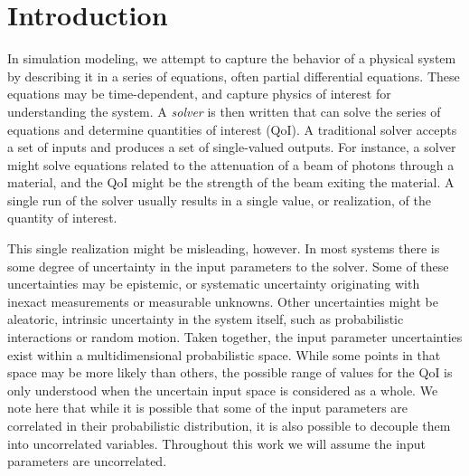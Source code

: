 
\chapter{Introduction} %

\label{ch:intro} %




In simulation modeling, we attempt to capture the behavior of a physical system by describing it in a series
of equations, often partial differential equations.  These equations may be time-dependent, and capture
physics of interest for understanding the system.  A \emph{solver} is then written that can solve the series
of equations and determine quantities of interest (QoI).  A traditional solver accepts a set of inputs and
produces a set of single-valued outputs.  For instance, a solver might solve equations related to the
attenuation of a beam of photons through a material, and the QoI might be the strength of the beam exiting the
material.  A single run of the solver usually results in a single value, or realization, of the quantity of
interest.

This single realization might be misleading, however.  In most systems there is some degree of uncertainty in
the input parameters to the solver.  Some of these uncertainties may be epistemic, or systematic uncertainty
originating with inexact measurements or measurable unknowns.  Other uncertainties might be aleatoric,
intrinsic uncertainty in the system itself, such as probabilistic interactions or random motion.  Taken
together, the input parameter uncertainties exist within a multidimensional probabilistic space.  While some
points in that space may be more likely than others, the possible range of values for the QoI is only
understood when the uncertain input space is considered as a whole.  We note here that while it is possible
that some of the input parameters are correlated in their probabilistic distribution, it is also possible to
decouple them into uncorrelated variables.  Throughout this work we will assume the input parameters 
are uncorrelated.


